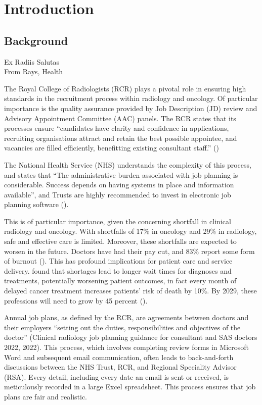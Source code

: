 \chapter{Introduction}
\section{Background}
\epigraph{Ex Radiis Salutas\\From Rays, Health}{}
The Royal College of Radiologists (RCR) plays a pivotal role in ensuring high standards in the recruitment process within radiology and oncology. Of particular importance is the quality assurance provided by Job Description (JD) review and Advisory Appointment Committee (AAC) panels. The RCR states that its processes ensure “candidates have clarity and confidence in applications, recruiting organisations attract and retain the best possible appointee, and vacancies are filled efficiently, benefitting existing consultant staff.” (\cite{the_royal_college_of_radiologists_clinical_2022}) 

The National Health Service (NHS) understands the complexity of this process, and states that “The administrative burden associated with job planning is considerable. Success depends on having systems in place and information available”, and Trusts are highly recommended to invest in electronic job planning software (\cite{the_national_health_service_consultant_2017}).

This is of particular importance, given the concerning shortfall in clinical radiology and oncology. With shortfalls of 17\% in oncology and 29\% in radiology, safe and effective care is limited. Moreover, these shortfalls are expected to worsen in the future. Doctors have had their pay cut, and 83\% report some form of burnout (\cite{the_royal_college_of_radiologists_rcr_2023}). This has profound implications for patient care and service delivery. \textcite{limb_shortages_2022} found that shortages lead to longer wait times for diagnoses and treatments, potentially worsening patient outcomes, in fact every month of delayed cancer treatment increases patients’ risk of death by 10\%. By 2029, these professions will need to grow by 45 percent (\cite{the_national_health_service_strategic_2018}).

Annual job plans, as defined by the RCR, are agreements between doctors and their employers “setting out the duties, responsibilities and objectives of the doctor” (Clinical radiology job planning guidance for consultant and SAS doctors 2022, 2022). This process, which involves completing review forms in Microsoft Word and subsequent email communication, often leads to back-and-forth discussions between the NHS Trust, RCR, and Regional Speciality Advisor (RSA). Every detail, including every date an email is sent or received, is meticulously recorded in a large Excel spreadsheet. This process ensures that job plans are fair and realistic.

